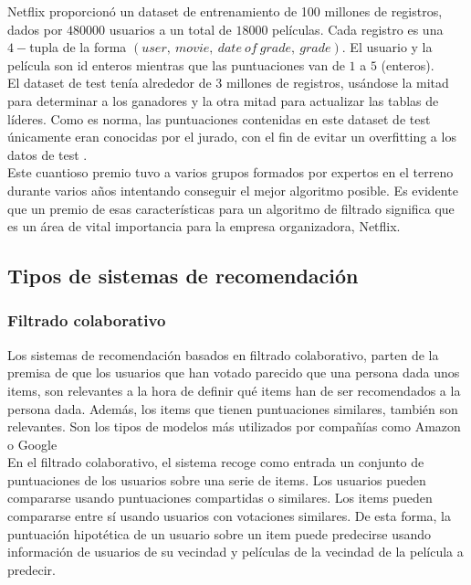 Netflix proporcionó un dataset de entrenamiento de 100 millones de registros, dados por $480000$ usuarios a un total de $18000$ películas. Cada registro es una $4-$tupla de la forma $(user,\ movie,\ date\ of\ grade,\ grade)$. El usuario y la película son id enteros mientras que las puntuaciones van de $1$ a $5$ (enteros).\\

El dataset de test tenía alrededor de 3 millones de registros, usándose la mitad para determinar a los ganadores y la otra mitad para actualizar las tablas de líderes. Como es norma, las puntuaciones contenidas en este dataset de test únicamente eran conocidas por el jurado, con el fin de evitar un overfitting a los datos de test \cite{overfitting}.\\

Este cuantioso premio tuvo a varios grupos formados por expertos en el terreno durante varios años intentando conseguir el mejor algoritmo posible. Es evidente que un premio de esas características para un algoritmo de filtrado significa que es un área de vital importancia para la empresa organizadora, Netflix.


\subsection{Tipos de sistemas de recomendación}

\subsubsection{Filtrado colaborativo}

Los sistemas de recomendación basados en filtrado colaborativo, parten de la premisa de que los usuarios que han votado parecido que una persona dada unos items, son relevantes a la hora de definir qué items han de ser recomendados a la persona dada. Además, los items que tienen puntuaciones similares, también son relevantes. Son los tipos de modelos más utilizados por compañías como Amazon \cite{Amazon} o Google \cite{Google}\\

En el filtrado colaborativo, el sistema recoge como entrada un conjunto de puntuaciones de los usuarios sobre una serie de items. Los usuarios pueden compararse usando puntuaciones compartidas o similares. Los items pueden compararse entre sí usando usuarios con votaciones similares. De esta forma, la puntuación hipotética de un usuario sobre un item puede predecirse usando información de usuarios de su vecindad y películas de la vecindad de la película a predecir.\\

